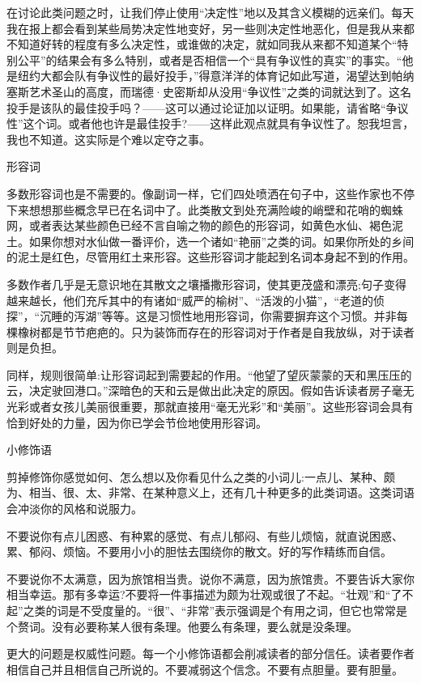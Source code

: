在讨论此类问题之时，让我们停止使用“决定性”地以及其含义模糊的远亲们。每天我在报上都会看到某些局势决定性地变好，另一些则决定性地恶化，但是我从来都不知道好转的程度有多么决定性，或谁做的决定，就如同我从来都不知道某个“特别公平”的结果会有多么特别，或者是否相信一个“具有争议性的真实”的事实。“他是纽约大都会队有争议性的最好投手，”得意洋洋的体育记如此写道，渴望达到帕纳塞斯艺术圣山的高度，而瑞德·史密斯却从没用“争议性”之类的词就达到了。这名投手是该队的最佳投手吗？——这可以通过论证加以证明。如果能，请省略“争议性”这个词。或者他也许是最佳投手?——这样此观点就具有争议性了。恕我坦言，我也不知道。这实际是个难以定夺之事。

形容词

多数形容词也是不需要的。像副词一样，它们四处喷洒在句子中，这些作家也不停下来想想那些概念早已在名词中了。此类散文到处充满险峻的峭壁和花哨的蜘蛛网，或者表达某些颜色已经不言自喻之物的颜色的形容词，如黄色水仙、褐色泥土。如果你想对水仙做一番评价，选一个诸如“艳丽”之类的词。如果你所处的乡间的泥土是红色，尽管用红土来形容。这些形容词才能起到名词本身起不到的作用。

多数作者几乎是无意识地在其散文之壤播撒形容词，使其更茂盛和漂亮;句子变得越来越长，他们充斥其中的有诸如“威严的榆树”、“活泼的小猫”，“老道的侦探”，“沉睡的泻湖”等等。这是习惯性地用形容词，你需要摒弃这个习惯。并非每棵橡树都是节节疤疤的。只为装饰而存在的形容词对于作者是自我放纵，对于读者则是负担。

同样，规则很简单:让形容词起到需要起的作用。“他望了望灰蒙蒙的天和黑压压的云，决定驶回港口。”深暗色的天和云是做出此决定的原因。假如告诉读者房子毫无光彩或者女孩儿美丽很重要，那就直接用“毫无光彩”和“美丽”。这些形容词会具有恰到好处的力量，因为你已学会节俭地使用形容词。

小修饰语

剪掉修饰你感觉如何、怎么想以及你看见什么之类的小词儿:一点儿、某种、颇为、相当、很、太、非常、在某种意义上，还有几十种更多的此类词语。这类词语会冲淡你的风格和说服力。

不要说你有点儿困惑、有种累的感觉、有点儿郁闷、有些儿烦恼，就直说困惑、累、郁闷、烦恼。不要用小小的胆怯去围绕你的散文。好的写作精练而自信。

不要说你不太满意，因为旅馆相当贵。说你不满意，因为旅馆贵。不要告诉大家你相当幸运。那有多幸运?不要将一件事描述为颇为壮观或很了不起。“壮观”和“了不起”之类的词是不受度量的。“很”、“非常”表示强调是个有用之词，但它也常常是个赘词。没有必要称某人很有条理。他要么有条理，要么就是没条理。

更大的问题是权威性问题。每一个小修饰语都会削减读者的部分信任。读者要作者相信自己并且相信自己所说的。不要减弱这个信念。不要有点胆量。要有胆量。

